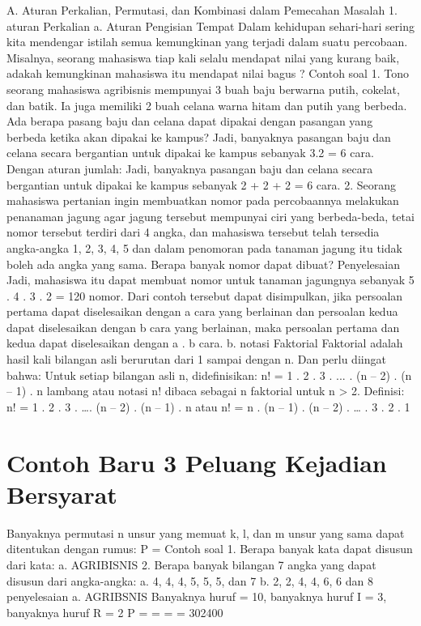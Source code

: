 \documentclass[11pt,fleqn]{book} %
\begin{document}
{{A.    Aturan Perkalian, Permutasi, dan Kombinasi dalam Pemecahan Masalah
1. aturan Perkalian
a. Aturan Pengisian Tempat
Dalam kehidupan sehari-hari sering kita mendengar istilah semua kemungkinan
yang terjadi dalam suatu percobaan. Misalnya, seorang mahasiswa tiap kali selalu mendapat nilai yang kurang baik, adakah kemungkinan mahasiswa itu mendapat nilai bagus ?
Contoh soal
1. Tono seorang mahasiswa agribisnis mempunyai 3 buah baju berwarna putih, cokelat, dan batik. Ia juga memiliki 2 buah celana warna hitam dan putih yang berbeda. Ada berapa pasang baju dan celana dapat dipakai dengan pasangan yang berbeda ketika akan dipakai ke kampus?
Jadi, banyaknya pasangan baju dan celana secara bergantian untuk dipakai ke kampus  sebanyak 3.2 = 6 cara.
Dengan aturan jumlah:
Jadi, banyaknya pasangan baju dan celana secara bergantian untuk dipakai ke kampus sebanyak 2 + 2 + 2 = 6 cara.
2. Seorang mahasiswa pertanian ingin membuatkan nomor pada percobaannya melakukan penanaman jagung agar jagung tersebut mempunyai ciri yang berbeda-beda, tetai nomor tersebut terdiri dari 4 angka, dan mahasiswa tersebut telah tersedia angka-angka 1, 2, 3, 4, 5 dan dalam penomoran pada tanaman jagung itu tidak boleh ada angka yang sama.
Berapa banyak nomor dapat dibuat?
Penyelesaian
Jadi, mahasiswa itu dapat membuat nomor untuk tanaman jagungnya sebanyak 5 . 4 . 3 . 2 = 120 nomor.
Dari contoh tersebut dapat disimpulkan, jika persoalan pertama dapat diselesaikan dengan a cara yang berlainan dan persoalan kedua dapat diselesaikan dengan b cara yang berlainan, maka persoalan pertama dan kedua dapat diselesaikan dengan a . b cara.
b. notasi Faktorial
Faktorial adalah hasil kali bilangan asli berurutan dari 1 sampai dengan n.
Dan perlu diingat bahwa:
Untuk setiap bilangan asli n, didefinisikan:
n! = 1 . 2 . 3 . ... . (n – 2) . (n – 1) . n
lambang atau notasi n! dibaca sebagai n faktorial untuk n > 2.
Definisi:
n! = 1 . 2 . 3 . …. (n – 2) . (n – 1) . n atau
n! = n . (n – 1) . (n – 2) . … . 3 . 2 . 1



\section{Contoh Baru 3 Peluang Kejadian Bersyarat}


Banyaknya permutasi n unsur yang memuat k, l, dan m unsur yang sama dapat
ditentukan dengan rumus: P = 
Contoh soal
1. Berapa banyak kata dapat disusun dari kata:
a. AGRIBISNIS
2. Berapa banyak bilangan 7 angka yang dapat disusun dari angka-angka:
a. 4, 4, 4, 5, 5, 5, dan 7
b. 2, 2, 4, 4, 6, 6 dan 8
penyelesaian
a.       AGRIBSNIS
Banyaknya huruf = 10, banyaknya huruf I = 3, banyaknya huruf R = 2
P =  =  =  = 302400

}}
\end{document}
